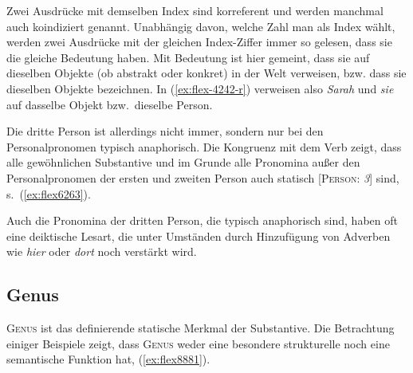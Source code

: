 Zwei Ausdrücke mit demselben Index sind korreferent und werden manchmal auch koindiziert genannt.
Unabhängig davon, welche Zahl man als Index wählt, werden zwei Ausdrücke mit der gleichen Index-Ziffer immer so gelesen, dass sie die gleiche Bedeutung haben.
Mit Bedeutung ist hier gemeint, dass sie auf dieselben Objekte (ob abstrakt oder konkret) in der Welt verweisen, bzw. dass sie dieselben Objekte bezeichnen.
In (\ref{ex:flex-4242-r}) verweisen also \textit{Sarah} und \textit{sie} auf dasselbe Objekt bzw.\ dieselbe Person.

Die dritte Person ist allerdings nicht immer, sondern nur bei den Personalpronomen typisch anaphorisch.
Die Kongruenz mit dem Verb zeigt, dass alle gewöhnlichen Substantive und im Grunde alle Pronomina außer den Personalpronomen der ersten und zweiten Person auch statisch [\textsc{Person}: \textit{3}] sind, s.\ (\ref{ex:flex6263}).

\begin{exe}
  \ex \label{ex:flex6263}
  \begin{xlist}
  \end{xlist}
\end{exe}

Auch die Pronomina der dritten Person, die typisch anaphorisch sind, haben oft eine deiktische Lesart, die unter Umständen durch Hinzufügung von Adverben wie \textit{hier} oder \textit{dort} noch verstärkt wird.

\begin{exe}
\end{exe}

\subsection{Genus}


\textsc{Genus} ist das definierende statische Merkmal der Substantive.
Die Betrachtung einiger Beispiele zeigt, dass \textsc{Genus} weder eine besondere strukturelle noch eine semantische Funktion hat, (\ref{ex:flex8881}).

\begin{exe}
  \ex \label{ex:flex8881}
  \begin{xlist}
  \end{xlist}
\end{exe}

